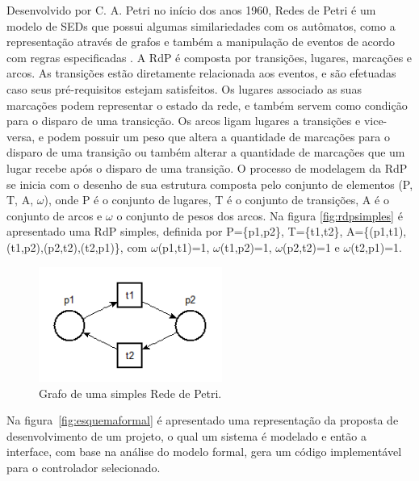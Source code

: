 Desenvolvido por C. A. Petri no in\'icio dos anos 1960, Redes de Petri \'e um modelo de SEDs que possui algumas similariedades com os aut\^omatos, como a representa\c{c}\~ao atrav\'es de grafos e tamb\'em a manipula\c{c}\~ao de eventos de acordo com regras especificadas \cite{Cassandras2008}. A RdP \'e composta por transi\c{c}\~oes, lugares, marca\c{c}\~oes e arcos. As transi\c{c}\~oes est\~ao diretamente relacionada aos eventos, e s\~ao efetuadas caso seus pr\'e-requisitos estejam satisfeitos. Os lugares associado as suas marca\c{c}\~oes podem representar o estado da rede, e tamb\'em servem como condi\c{c}\~ao para o disparo de uma transic\c{c}\~ao. Os arcos ligam lugares a transi\c{c}\~oes e vice-versa, e podem possuir um peso que altera a quantidade de marca\c{c}\~oes para o disparo de uma transi\c{c}\~ao ou tamb\'em alterar a quantidade de marca\c{c}\~oes que um lugar recebe ap\'os o disparo de uma transi\c{c}\~ao.
O processo de modelagem da RdP se inicia com o desenho de sua estrutura composta pelo conjunto de elementos (P, T, A, $\omega$), onde P \'e o conjunto de lugares, T \'e o conjunto de transi\c{c}\~oes, A \'e o conjunto de arcos e $\omega$ o conjunto de pesos dos arcos. Na figura \ref{fig:rdpsimples} \'e apresentado uma RdP simples, definida por P=\{p1,p2\}, T=\{t1,t2\}, A=\{(p1,t1),(t1,p2),(p2,t2),(t2,p1)\}, com  $\omega$(p1,t1)=1, $\omega$(t1,p2)=1, $\omega$(p2,t2)=1 e $\omega$(t2,p1)=1.


\begin{figure}[!htb]
	\caption[Grafo de uma simples Rede de Petri]{Grafo de uma simples Rede de Petri.}
	\label{fig:rspsimples}
	\includegraphics[width=6cm]{./figuras/RDP_SIMPLES.png}\centering
\end{figure}






Na figura~\ref{fig:esquemaformal} é apresentado uma representa\c{c}\~ao da proposta de desenvolvimento de um projeto, o qual um sistema \'e modelado e ent\~ao a interface, com base na an\'alise do modelo formal, gera um c\'odigo implement\'avel para o controlador selecionado. 

